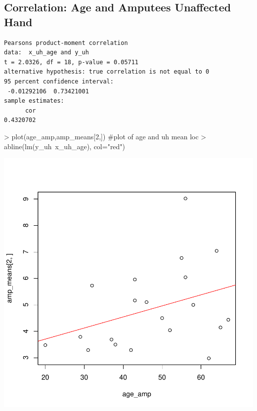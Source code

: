 \documentclass{article}
\begin{document}
\subsection*{Correlation: Age and Amputees Unaffected Hand}
\begin{verbatim}
Pearsons product-moment correlation
data:  x_uh_age and y_uh
t = 2.0326, df = 18, p-value = 0.05711
alternative hypothesis: true correlation is not equal to 0
95 percent confidence interval:
 -0.01292106  0.73421001
sample estimates:
      cor 
0.4320702
\end{verbatim}
\begin{Schunk}
\begin{Sinput}
> plot(age_amp,amp_means[2,]) #plot of age and uh mean loc
> abline(lm(y_uh~x_uh_age), col="red")
\end{Sinput}
\end{Schunk}
\includegraphics{15_3_20_Loc_results-007}

\newpage
\end{document}
